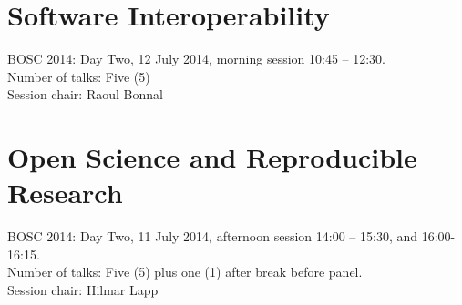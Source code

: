 \documentclass[10pt,oneside]{article}
\begin{document}
\newpage
\section*{Software Interoperability}
BOSC 2014: Day Two, 12 July 2014, morning session 10:45 -- 12:30. \\
\noindent Number of talks: Five (5) \\
\noindent Session chair: Raoul Bonnal 





\newpage
\section*{Open Science and Reproducible Research }
BOSC 2014: Day Two, 11 July 2014, afternoon session 14:00 -- 15:30, and 16:00-16:15. \\
\noindent Number of talks: Five (5) plus one (1) after break before panel. \\
\noindent Session chair: Hilmar Lapp






\end{document}
